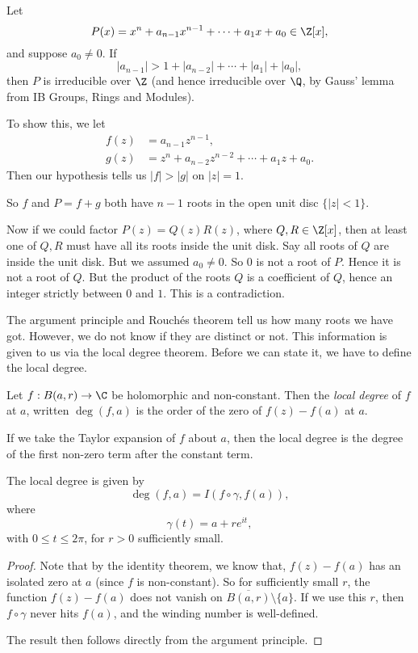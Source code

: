 \documentclass[a4paper]{article}
\begin{document}
\begin{eg}
  Let
  \[
    P(x) = x^n + a_{n - 1} x^{n - 1} + \cdots + a_1 x + a_0 \in \Z[x],
  \]
  and suppose $a_0 \not= 0$. If
  \[
    |a_{n - 1}| > 1 + |a_{n - 2}| + \cdots + |a_1| + |a_0|,
  \]
  then $P$ is irreducible over $\Z$ (and hence irreducible over $\Q$, by Gauss' lemma from IB Groups, Rings and Modules).

  To show this, we let
  \begin{align*}
    f(z) &= a_{n - 1} z^{n - 1},\\
    g(z) &= z^n + a_{n - 2}z^{n - 2} + \cdots + a_1 z + a_0.
  \end{align*}
  Then our hypothesis tells us $|f| > |g|$ on $|z| = 1$.

  So $f$ and $P = f + g$ both have $n - 1$ roots in the open unit disc $\{|z| < 1\}$.

  Now if we could factor $P(z) = Q(z)R(z)$, where $Q, R \in \Z[x]$, then at least one of $Q, R$ must have all its roots inside the unit disk. Say all roots of $Q$ are inside the unit disk. But we assumed $a_0 \not= 0$. So $0$ is not a root of $P$. Hence it is not a root of $Q$. But the product of the roots $Q$ is a coefficient of $Q$, hence an integer strictly between $0$ and $1$. This is a contradiction.
\end{eg}

The argument principle and Rouch\'es theorem tell us how many roots we have got. However, we do not know if they are distinct or not. This information is given to us via the local degree theorem. Before we can state it, we have to define the local degree.

\begin{defi}
  Let $f: B(a, r) \to \C$ be holomorphic and non-constant. Then the \emph{local degree} of $f$ at $a$, written $\deg(f, a)$ is the order of the zero of $f(z) - f(a)$ at $a$.
\end{defi}
If we take the Taylor expansion of $f$ about $a$, then the local degree is the degree of the first non-zero term after the constant term.

\begin{lemma}
  The local degree is given by
  \[
    \deg (f, a) = I (f \circ \gamma, f(a)),
  \]
  where
  \[
    \gamma(t) = a + re^{it},
  \]
  with $0 \leq t \leq 2\pi$, for $r > 0$ sufficiently small.
\end{lemma}

\begin{proof}
  Note that by the identity theorem, we know that, $f(z) - f(a)$ has an isolated zero at $a$ (since $f$ is non-constant). So for sufficiently small $r$, the function $f(z) - f(a)$ does not vanish on $\overline{B(a, r)} \setminus \{a\}$. If we use this $r$, then $f \circ \gamma$ never hits $f(a)$, and the winding number is well-defined.

  The result then follows directly from the argument principle.
\end{proof}
\end{document}
